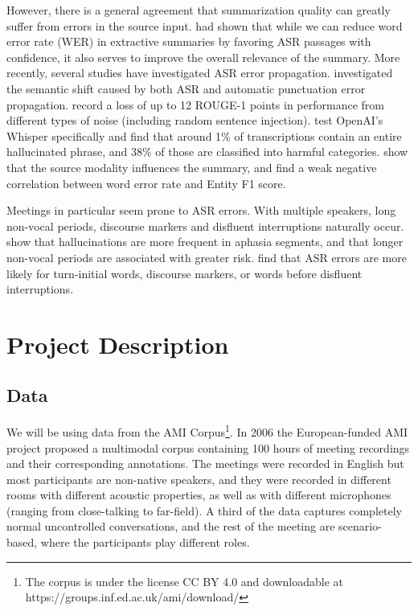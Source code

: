 \documentclass[11pt]{article}
\begin{document}
However, there is a general agreement that summarization quality can greatly suffer from errors in the source input.
\citet{zechner-waibel-2000-minimizing} had shown that while we can reduce word error rate (WER) in extractive summaries by favoring ASR passages with confidence, it also serves to improve the overall relevance of the summary.
More recently, several studies have investigated ASR error propagation.
\citet{tundik-et-al-2019-semantic-shift} investigated the semantic shift caused by both ASR and automatic punctuation error propagation.
\citet{krishna-etal-2023-improving} record a loss of up to 12 ROUGE-1 points in performance from different types of noise (including random sentence injection).
\citet{Koenecke_2024} test OpenAI's Whisper \citep{radford-2023-whisper} specifically and find that around 1\% of transcriptions contain an entire hallucinated phrase, and 38\% of those are classified into harmful categories.
\citet{sharma-etal-2024-speech} show that the source modality influences the summary, and find a weak negative correlation between word error rate and Entity F1 score.

Meetings in particular seem prone to ASR errors.
With multiple speakers, long non-vocal periods, discourse markers and disfluent interruptions naturally occur.
\citet{Koenecke_2024} show that hallucinations are more frequent in aphasia segments, and that longer non-vocal periods are associated with greater risk.
\citet{goldwater-etal-2008-words} find that ASR errors are more likely for turn-initial words, discourse markers, or words before disfluent interruptions.

\section{Project Description}

\subsection{Data}

We will be using data from the AMI Corpus\footnote{The corpus is under the license CC BY 4.0 and downloadable at https://groups.inf.ed.ac.uk/ami/download/}.
In 2006 the European-funded AMI project proposed a multimodal corpus containing 100 hours of meeting recordings and their corresponding annotations.
The meetings were recorded in English but most participants are non-native speakers, and they were recorded in different rooms with different acoustic properties, as well as with different microphones (ranging from close-talking to far-field).
A third of the data captures completely normal uncontrolled conversations, and the rest of the meeting are scenario-based, where the participants play different roles.
\end{document}
